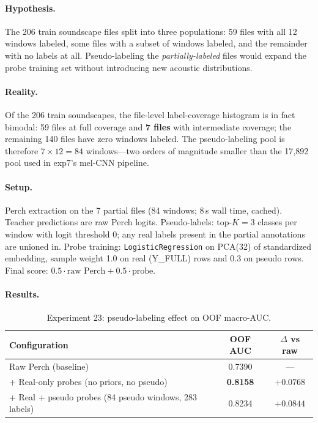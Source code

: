 \paragraph{Hypothesis.}
The 206 train soundscape files split into three populations: 59 files
with all 12 windows labeled, some files with a subset of windows
labeled, and the remainder with no labels at all. Pseudo-labeling the
\emph{partially-labeled} files would expand the probe training set
without introducing new acoustic distributions.

\paragraph{Reality.}
Of the 206 train soundscapes, the file-level label-coverage histogram is
in fact bimodal: 59 files at full coverage and \textbf{7 files} with
intermediate coverage; the remaining 140 files have zero windows
labeled. The pseudo-labeling pool is therefore $7 \times 12 = 84$
windows---two orders of magnitude smaller than the 17{,}892 pool used in
exp7's mel-CNN pipeline.

\paragraph{Setup.}
Perch extraction on the 7 partial files (84 windows; 8\,s wall time,
cached). Teacher predictions are raw Perch logits. Pseudo-labels:
top-$K{=}3$ classes per window with logit threshold 0; any real labels
present in the partial annotations are unioned in. Probe training:
\texttt{LogisticRegression} on PCA(32) of standardized embedding,
sample weight 1.0 on real (Y\_FULL) rows and 0.3 on pseudo rows.
Final score: $0.5 \cdot \text{raw Perch} + 0.5 \cdot \text{probe}$.

\paragraph{Results.}
\begin{table}[h]
\centering
\caption{Experiment 23: pseudo-labeling effect on OOF macro-AUC.}
\label{tab:exp23}
\begin{tabular}{lcc}
\hline
\textbf{Configuration} & \textbf{OOF AUC} & \textbf{$\Delta$ vs raw} \\
\hline
Raw Perch (baseline)                                  & 0.7390 & --- \\
+ Real-only probes (no priors, no pseudo)             & \textbf{0.8158} & $+0.0768$ \\
+ Real + pseudo probes (84 pseudo windows, 283 labels) & 0.8234 & $+0.0844$ \\
\hline
\end{tabular}
\end{table}

